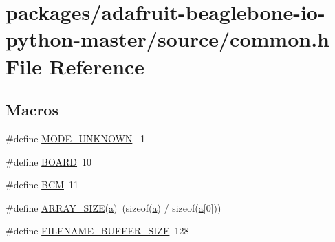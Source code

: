 \hypertarget{adafruit-beaglebone-io-python-master_2source_2common_8h}{}\section{packages/adafruit-\/beaglebone-\/io-\/python-\/master/source/common.h File Reference}
\label{adafruit-beaglebone-io-python-master_2source_2common_8h}
\subsection*{Macros}
\begin{DoxyCompactItemize}
\item 
\#define \hyperlink{adafruit-beaglebone-io-python-master_2source_2common_8h_a5d0c3656233586f9704490db1ad1d6f4}{M\+O\+D\+E\+\_\+\+U\+N\+K\+N\+O\+W\+N}~-\/1
\item 
\#define \hyperlink{adafruit-beaglebone-io-python-master_2source_2common_8h_a51ed2bd47e7f4b9e8c005338d2b5d965}{B\+O\+A\+R\+D}~10
\item 
\#define \hyperlink{adafruit-beaglebone-io-python-master_2source_2common_8h_ab9ef969b607c051bd612cbe18253ec9e}{B\+C\+M}~11
\item 
\#define \hyperlink{adafruit-beaglebone-io-python-master_2source_2common_8h_a25f003de16c08a4888b69f619d70f427}{A\+R\+R\+A\+Y\+\_\+\+S\+I\+Z\+E}(\hyperlink{gen__mat5files_8m_aae328bf20413f220e38aec4d95bfd6da}{a})~(sizeof(\hyperlink{gen__mat5files_8m_aae328bf20413f220e38aec4d95bfd6da}{a}) / sizeof(\hyperlink{gen__mat5files_8m_aae328bf20413f220e38aec4d95bfd6da}{a}\mbox{[}0\mbox{]}))
\item 
\#define \hyperlink{adafruit-beaglebone-io-python-master_2source_2common_8h_a8582aa6637e4bfd8770ca7385a2babb5}{F\+I\+L\+E\+N\+A\+M\+E\+\_\+\+B\+U\+F\+F\+E\+R\+\_\+\+S\+I\+Z\+E}~128
\end{DoxyCompactItemize}
